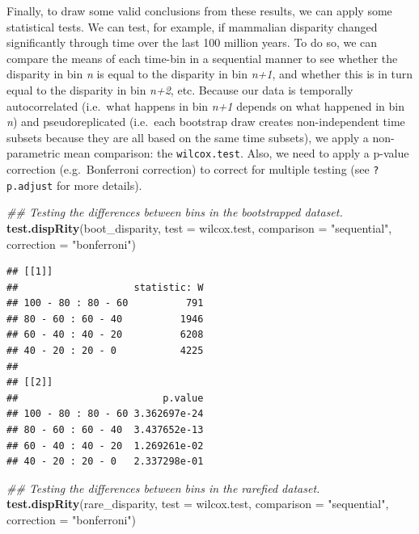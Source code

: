 \documentclass[]{book}
\newenvironment{Shaded}{\begin{snugshade}}{\end{snugshade}}
\newcommand{\CommentTok}[1]{\textcolor[rgb]{0.56,0.35,0.01}{\textit{#1}}}
\newcommand{\DataTypeTok}[1]{\textcolor[rgb]{0.13,0.29,0.53}{#1}}
\newcommand{\KeywordTok}[1]{\textcolor[rgb]{0.13,0.29,0.53}{\textbf{#1}}}
\newcommand{\NormalTok}[1]{#1}
\newcommand{\StringTok}[1]{\textcolor[rgb]{0.31,0.60,0.02}{#1}}
\begin{document}
Finally, to draw some valid conclusions from these results, we can apply some statistical tests.
We can test, for example, if mammalian disparity changed significantly through time over the last 100 million years.
To do so, we can compare the means of each time-bin in a sequential manner to see whether the disparity in bin \emph{n} is equal to the disparity in bin \emph{n+1}, and whether this is in turn equal to the disparity in bin \emph{n+2}, etc.
Because our data is temporally autocorrelated (i.e.~what happens in bin \emph{n+1} depends on what happened in bin \emph{n}) and pseudoreplicated (i.e.~each bootstrap draw creates non-independent time subsets because they are all based on the same time subsets), we apply a non-parametric mean comparison: the \texttt{wilcox.test}.
Also, we need to apply a p-value correction (e.g.~Bonferroni correction) to correct for multiple testing (see \texttt{?p.adjust} for more details).

\begin{Shaded}
\begin{Highlighting}[]
\CommentTok{## Testing the differences between bins in the bootstrapped dataset.}
\KeywordTok{test.dispRity}\NormalTok{(boot_disparity, }\DataTypeTok{test =}\NormalTok{ wilcox.test, }\DataTypeTok{comparison =} \StringTok{"sequential"}\NormalTok{,}
    \DataTypeTok{correction =} \StringTok{"bonferroni"}\NormalTok{)}
\end{Highlighting}
\end{Shaded}

\begin{verbatim}
## [[1]]
##                    statistic: W
## 100 - 80 : 80 - 60          791
## 80 - 60 : 60 - 40          1946
## 60 - 40 : 40 - 20          6208
## 40 - 20 : 20 - 0           4225
## 
## [[2]]
##                         p.value
## 100 - 80 : 80 - 60 3.362697e-24
## 80 - 60 : 60 - 40  3.437652e-13
## 60 - 40 : 40 - 20  1.269261e-02
## 40 - 20 : 20 - 0   2.337298e-01
\end{verbatim}

\begin{Shaded}
\begin{Highlighting}[]
\CommentTok{## Testing the differences between bins in the rarefied dataset.}
\KeywordTok{test.dispRity}\NormalTok{(rare_disparity, }\DataTypeTok{test =}\NormalTok{ wilcox.test, }\DataTypeTok{comparison =} \StringTok{"sequential"}\NormalTok{,}
    \DataTypeTok{correction =} \StringTok{"bonferroni"}\NormalTok{)}
\end{Highlighting}
\end{Shaded}
\end{document}
